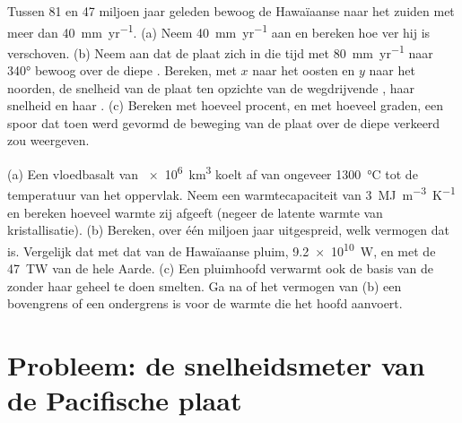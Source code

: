 \begin{exercise}[$\star\star\star$]\label{exo:b1:hotspots:11}
Tussen 81 en 47 miljoen jaar geleden bewoog de Hawaïaanse  naar het zuiden met meer dan \qty{40}{mm.yr^{-1}}. (a) Neem \qty{40}{mm.yr^{-1}} aan en bereken hoe ver hij is verschoven.
(b) Neem aan dat de plaat zich in die tijd met \qty{80}{mm.yr^{-1}} naar \ang{340} bewoog over de diepe . Bereken, met $x$ naar het oosten en $y$ naar het noorden, de snelheid van de plaat ten opzichte van de wegdrijvende , haar snelheid en haar . (c) Bereken met hoeveel procent, en met hoeveel graden, een spoor dat toen werd gevormd de beweging van de plaat over de diepe  verkeerd zou weergeven.
\end{exercise}

\begin{exercise}[$\star\star\star$]\label{exo:b1:hotspots:12}
(a) Een vloedbasalt van \qty{e6}{km^3} koelt af van ongeveer \qty{1300}{\celsius} tot de temperatuur van het oppervlak. Neem een warmtecapaciteit van \qty{3}{MJ.m^{-3}.K^{-1}} en bereken hoeveel warmte zij afgeeft (negeer de latente warmte van kristallisatie). (b) Bereken, over één miljoen jaar uitgespreid, welk vermogen dat is. Vergelijk dat met dat van de Hawaïaanse pluim, \qty{9.2e10}{W}, en met de \qty{47}{TW} van de hele Aarde. (c) Een pluimhoofd verwarmt ook de basis van de  zonder haar geheel te doen smelten. Ga na of het vermogen van (b) een bovengrens of een ondergrens is voor de warmte die het hoofd aanvoert.
\end{exercise}

\section{Probleem: de snelheidsmeter van de Pacifische plaat}


